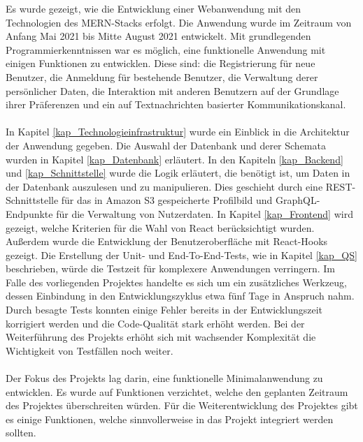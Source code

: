 Es wurde gezeigt, wie die Entwicklung einer Webanwendung mit den Technologien des MERN-Stacks erfolgt.
Die Anwendung wurde im Zeitraum von Anfang Mai 2021 bis Mitte August 2021 entwickelt.
Mit grundlegenden Programmierkenntnissen war es möglich, eine funktionelle Anwendung mit einigen Funktionen zu entwicklen.
Diese sind: die Registrierung für neue Benutzer, die Anmeldung für bestehende Benutzer, die Verwaltung derer persönlicher Daten, die Interaktion mit anderen Benutzern auf der Grundlage ihrer Präferenzen und ein auf Textnachrichten basierter Kommunikationskanal.
\\\\
In Kapitel \ref{kap_Technologieinfrastruktur} wurde ein Einblick in die Architektur der Anwendung gegeben. %
Die Auswahl der Datenbank und derer Schemata wurden in Kapitel \ref{kap_Datenbank} erläutert.
In den Kapiteln \ref{kap_Backend} und \ref{kap_Schnittstelle} wurde die Logik erläutert, die benötigt ist, um Daten in der Datenbank auszulesen und zu manipulieren.
Dies geschieht durch eine REST-Schnittstelle für das in Amazon S3 gespeicherte Profilbild und GraphQL-Endpunkte für die Verwaltung von Nutzerdaten. 
In Kapitel \ref{kap_Frontend} wird gezeigt, welche Kriterien für die Wahl von React berücksichtigt wurden. 
Außerdem wurde die Entwicklung der Benutzeroberfläche mit React-Hooks gezeigt. 
Die Erstellung der Unit- und End-To-End-Tests, wie in Kapitel \ref{kap_QS} beschrieben, würde die Testzeit für komplexere Anwendungen verringern.
Im Falle des vorliegenden Projektes handelte es sich um ein zusätzliches Werkzeug, dessen Einbindung in den Entwicklungszyklus etwa fünf Tage in Anspruch nahm.
Durch besagte Tests konnten einige Fehler bereits in der Entwicklungszeit korrigiert werden und die Code-Qualität stark erhöht werden.
Bei der Weiterführung des Projekts erhöht sich mit wachsender Komplexität die Wichtigkeit von Testfällen noch weiter.
\\\\
Der Fokus des Projekts lag darin, eine funktionelle Minimalanwendung zu entwicklen. Es wurde auf Funktionen verzichtet, welche den geplanten Zeitraum des Projektes überschreiten würden.
Für die Weiterentwicklung des Projektes gibt es einige Funktionen, welche sinnvollerweise in das Projekt integriert werden sollten.
